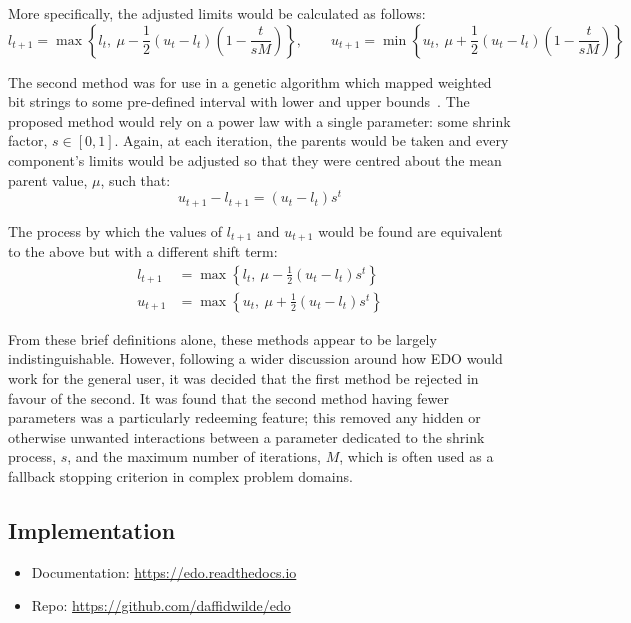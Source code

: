 More specifically, the adjusted limits would be calculated as follows:
\[
    l_{t+1} = \max \left\{%
        l_t, \ \mu - \frac{1}{2} (u_t - l_t) \left(1 - \frac{t}{sM}\right)
    \right\},
    \qquad%
    u_{t+1} = \min \left\{%
        u_t, \ \mu + \frac{1}{2} (u_t - l_t) \left(1 - \frac{t}{sM}\right)
    \right\}
\]

The second method was for use in a genetic algorithm which mapped weighted bit
strings to some pre-defined interval with lower and upper
bounds~\cite{Amirjanov2016}. The proposed method would rely on a power law with
a single parameter: some shrink factor, \(s \in [0, 1]\). Again, at each
iteration, the parents would be taken and every component's limits would be
adjusted so that they were centred about the mean parent value, \(\mu\), such
that:
\[
    u_{t+1} - l_{t+1} = (u_t - l_t) s^t
\]

The process by which the values of \(l_{t+1}\) and \(u_{t+1}\) would be found
are equivalent to the above but with a different shift term:
\begin{align}
    \label{eq:shrinking_lower}
    l_{t+1}&= \max \left\{l_t, \ \mu - \frac{1}{2} (u_t - l_t) s^t\right\}\\
    \label{eq:shrinking_upper}
    u_{t+1}&= \max \left\{u_t, \ \mu + \frac{1}{2} (u_t - l_t) s^t\right\}
\end{align}

From these brief definitions alone, these methods appear to be largely
indistinguishable. However, following a wider discussion around how EDO would
work for the general user, it was decided that the first method be rejected in
favour of the second. It was found that the second method having fewer
parameters was a particularly redeeming feature; this removed any hidden or
otherwise unwanted interactions between a parameter dedicated to the shrink
process, \(s\), and the maximum number of iterations, \(M\), which is often used
as a fallback stopping criterion in complex problem domains.



\subsection{Implementation}\label{subsection:implementation}

\begin{itemize}
    \item Documentation: \url{https://edo.readthedocs.io}
    \item Repo: \url{https://github.com/daffidwilde/edo}
\end{itemize}

